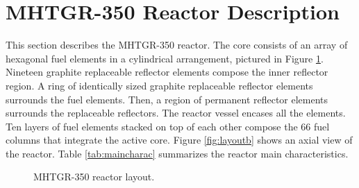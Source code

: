 \section{MHTGR-350 Reactor Description}
\label{sec:ch3-mhtgr}

This section describes the \gls{MHTGR}-350 reactor.
The core consists of an array of hexagonal fuel elements in a cylindrical arrangement, pictured in Figure \ref{fig:layout}.
Nineteen graphite replaceable reflector elements compose the inner reflector region.
A ring of identically sized graphite replaceable reflector elements surrounds the fuel elements.
Then, a region of permanent reflector elements surrounds the replaceable reflectors.
The reactor vessel encases all the elements.
Ten layers of fuel elements stacked on top of each other compose the 66 fuel columns that integrate the active core.
Figure \ref{fig:layoutb} shows an axial view of the reactor.
Table \ref{tab:maincharac} summarizes the reactor main characteristics.

\begin{figure}[htbp!]
    \centering
    \hfill
    \caption{MHTGR-350 reactor layout.}
    \label{fig:layout}
\end{figure}

